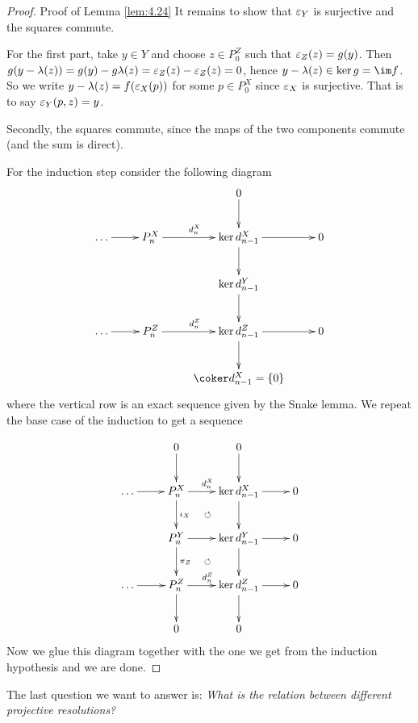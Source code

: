 \documentclass[twoside = false,	%
		headsepline,		%
		parskip = true,
		]{scrbook}						%
\begin{document}
\begin{proof}{Proof of Lemma \ref{lem:4.24}}
       It remains to show that $\varepsilon_Y$ is surjective and the squares commute.
       
       For the first part, take $y \in Y$ and choose $z \in P_0^Z$ such that $\varepsilon_Z(z) = g(y)$. Then $g(y - \lambda (z)) = g(y) - g \lambda (z) = \varepsilon_Z(z) - \varepsilon_Z(z) = 0$, hence $y - \lambda(z) \in \ker g = \im f$. So we write $y-\lambda(z) = f(\varepsilon_X(p))$ for some $p \in P_0^X$ since $\varepsilon_X$ is surjective. That is to say $\varepsilon_Y(p,z) = y$.

       Secondly, the squares commute, since the maps of the two components commute (and the sum is direct).

        For the induction step consider the following diagram
        \begin{equation*}
        \xymatrix {
                        &                          & 0 \ar[d] \\
            \dots \ar[r] & P_{n}^X \ar[r]^{d_n^X} & \ker d_{n-1}^X \ar[r] \ar[d]& 0 \\
            & & \ker d_{n-1}^Y \ar[d] \\
            \dots \ar[r] & P_{n}^Z \ar[r]^{d_n^Z} & \ker d_{n-1}^Z \ar[r] \ar[d] & 0 \\
            & & \coker d_{n-1}^X = \{0\}
        }
        \end{equation*}
        where the vertical row is an exact sequence given by the Snake lemma. We repeat the base case of the induction to get a sequence
        
        \begin{equation*}
        \xymatrix {
                        &  0 \ar[d] & 0 \ar[d] \\
            \dots \ar[r] & P_{n}^X \ar[d]^{\iota_{X}} \ar[r]^{d_n^X} & \ker d_{n-1}^X \ar[r] \ar[d]& 0 \\
            & P_{n}^Y \ar@{}[ur]|{\circlearrowleft} \ar[r] \ar[d]^{\pi_Z}& \ker d_{n-1}^Y \ar[d] \ar[r] & 0 \\
            \dots \ar[r] & P_{n}^Z \ar[r]^{d_n^Z} \ar@{}[ur]|{\circlearrowleft} \ar[d] & \ker d_{n-1}^Z \ar[r] \ar[d] & 0 \\
            & 0 &  0
        }
        \end{equation*}
        Now we glue this diagram together with the one we get from the induction hypothesis and we are done.
    \end{proof}

    The last question we want to answer is: \textit{What is the relation between different projective resolutions?}
\end{document}
